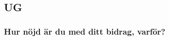 \documentclass[a4paper]{article}
\begin{document}
\subsection{UG}
\subsubsection{Hur nöjd är du med ditt bidrag, varför?}





\end{document}
